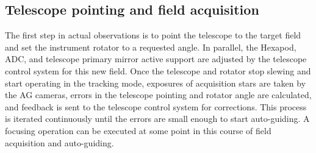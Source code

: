 \documentclass[a4paper]{article}
\begin{document}
\subsection{Telescope pointing and field acquisition}
The first step in actual observations is to point the telescope to the
target field and set the instrument rotator to a requested angle.  In
parallel, the Hexapod, ADC, and telescope primary mirror active
support are adjusted by the telescope control system for this new
field. Once the telescope and rotator stop slewing and start operating
in the tracking mode, exposures of acquisition stars are taken by the
AG cameras, errors in the telescope pointing and rotator angle are
calculated, and feedback is sent to the telescope control system for
corrections.  This process is iterated continuously until the errors
are small enough to start auto-guiding. A focusing operation can be
executed at some point in this course of field acquisition and
auto-guiding.
\end{document}
